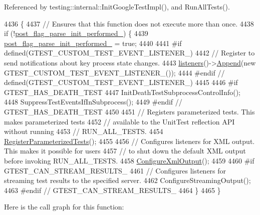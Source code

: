Referenced by testing\+::internal\+::\+Init\+Google\+Test\+Impl(), and Run\+All\+Tests().


\begin{DoxyCode}
4436                                        \{
4437   \textcolor{comment}{// Ensures that this function does not execute more than once.}
4438   \textcolor{keywordflow}{if} (!\hyperlink{classtesting_1_1internal_1_1UnitTestImpl_ab4c7d8a9ff3edbd8a98f91c4afaf3bb8}{post\_flag\_parse\_init\_performed\_}) \{
4439     \hyperlink{classtesting_1_1internal_1_1UnitTestImpl_ab4c7d8a9ff3edbd8a98f91c4afaf3bb8}{post\_flag\_parse\_init\_performed\_} = \textcolor{keyword}{true};
4440 
4441 \textcolor{preprocessor}{#if defined(GTEST\_CUSTOM\_TEST\_EVENT\_LISTENER\_)}
4442     \textcolor{comment}{// Register to send notifications about key process state changes.}
4443     \hyperlink{classtesting_1_1internal_1_1UnitTestImpl_a67211f8475936f88d0e4d30f841c0da4}{listeners}()->\hyperlink{classtesting_1_1TestEventListeners_a1207dce74d64c1c39ffa6105560536a0}{Append}(\textcolor{keyword}{new} GTEST\_CUSTOM\_TEST\_EVENT\_LISTENER\_());
4444 \textcolor{preprocessor}{#endif  // defined(GTEST\_CUSTOM\_TEST\_EVENT\_LISTENER\_)}
4445 
4446 \textcolor{preprocessor}{#if GTEST\_HAS\_DEATH\_TEST}
4447     InitDeathTestSubprocessControlInfo();
4448     SuppressTestEventsIfInSubprocess();
4449 \textcolor{preprocessor}{#endif  // GTEST\_HAS\_DEATH\_TEST}
4450 
4451     \textcolor{comment}{// Registers parameterized tests. This makes parameterized tests}
4452     \textcolor{comment}{// available to the UnitTest reflection API without running}
4453     \textcolor{comment}{// RUN\_ALL\_TESTS.}
4454     \hyperlink{classtesting_1_1internal_1_1UnitTestImpl_af84d2515f1a272a8783f00a3e8c0aff8}{RegisterParameterizedTests}();
4455 
4456     \textcolor{comment}{// Configures listeners for XML output. This makes it possible for users}
4457     \textcolor{comment}{// to shut down the default XML output before invoking RUN\_ALL\_TESTS.}
4458     \hyperlink{classtesting_1_1internal_1_1UnitTestImpl_a21cd7b2928de03a55b5252f29dd5ae6d}{ConfigureXmlOutput}();
4459 
4460 \textcolor{preprocessor}{#if GTEST\_CAN\_STREAM\_RESULTS\_}
4461     \textcolor{comment}{// Configures listeners for streaming test results to the specified server.}
4462     ConfigureStreamingOutput();
4463 \textcolor{preprocessor}{#endif  // GTEST\_CAN\_STREAM\_RESULTS\_}
4464   \}
4465 \}
\end{DoxyCode}
Here is the call graph for this function\+:
\nopagebreak
